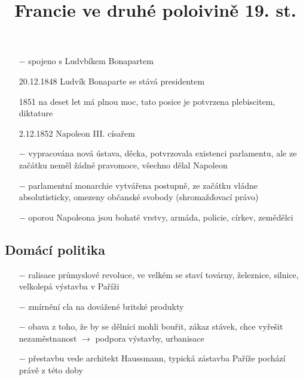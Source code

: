 \documentclass{article}
\title{\vspace{-2cm}Francie ve druhé poloivině 19. st.\vspace{-1.7cm}}
\date{}
\author{}
\begin{document}
\maketitle

\begin{itemize}
    \vspace{-0.5em}
    \setlength\itemsep{0.15em}
    \item[$-$] spojeno s Ludvbíkem Bonapartem
    \item[20.12.1848] Ludvík Bonaparte se stává presidentem
    \item[1851] na deset let má plnou moc, tato posice je potvrzena plebiscitem, diktature
    \item[2.12.1852] Napoleon III. císařem
    \item[$-$] vypracována nová ústava, děcka, potvrzovala existenci parlamentu, ale ze začátku neměl žádné pravomoce, všechno dělal Napoleon
    \item[$-$] parlamentní monarchie vytvářena postupně, ze začátku vládne absolutisticky, omezeny občanské svobody (shromažďovací právo)
    \item[$-$] oporou Napoleona jsou bohaté vrstvy, armáda, policie, církev, zemědělci
\end{itemize}

\subsection*{Domácí politika}
\begin{itemize}
    \vspace{-0.5em}
    \setlength\itemsep{0.15em}
    \item[$-$] ralisace průmyslové revoluce, ve velkém se staví továrny, železnice, silnice, velkolepá výstavba v Paříži
    \item[$-$] zmírnění cla na dovážené britské produkty
    \item[$-$] obava z toho, že by se dělníci mohli bouřit, zákaz stávek, chce vyřešit nezaměstnanost $\rightarrow$ podpora výstavby, urbanisace
    \item[$-$] přestavbu vede architekt Haussmann, typická zástavba Paříže pochází právě z této doby
\end{itemize}
\end{document}
